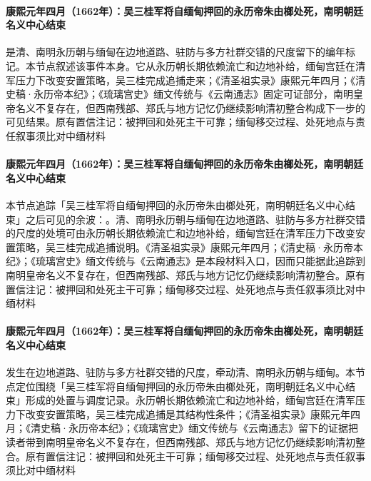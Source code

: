 \paragraph{康熙元年四月（1662年）：吴三桂军将自缅甸押回的永历帝朱由榔处死，南明朝廷名义中心结束}
 是清、南明永历朝与缅甸在边地道路、驻防与多方社群交错的尺度留下的编年标记。本节点叙述该事件本身。它从永历朝长期依赖流亡和边地补给，缅甸宫廷在清军压力下改变安置策略，吴三桂完成追捕走来；《清圣祖实录》康熙元年四月；《清史稿·永历帝本纪》；《琉璃宫史》缅文传统与《云南通志》固定可证部分，南明皇帝名义不复存在，但西南残部、郑氏与地方记忆仍继续影响清初整合构成下一步的可见结果。原有置信注记：被押回和处死主干可靠；缅甸移交过程、处死地点与责任叙事须比对中缅材料

\paragraph{康熙元年四月（1662年）：吴三桂军将自缅甸押回的永历帝朱由榔处死，南明朝廷名义中心结束}
本节点追踪「吴三桂军将自缅甸押回的永历帝朱由榔处死，南明朝廷名义中心结束」之后可见的余波：。清、南明永历朝与缅甸在边地道路、驻防与多方社群交错的尺度的处境可由永历朝长期依赖流亡和边地补给，缅甸宫廷在清军压力下改变安置策略，吴三桂完成追捕说明。《清圣祖实录》康熙元年四月；《清史稿·永历帝本纪》；《琉璃宫史》缅文传统与《云南通志》是本段材料入口，因而只能据此追踪到南明皇帝名义不复存在，但西南残部、郑氏与地方记忆仍继续影响清初整合。原有置信注记：被押回和处死主干可靠；缅甸移交过程、处死地点与责任叙事须比对中缅材料

\paragraph{康熙元年四月（1662年）：吴三桂军将自缅甸押回的永历帝朱由榔处死，南明朝廷名义中心结束}
 发生在边地道路、驻防与多方社群交错的尺度，牵动清、南明永历朝与缅甸。本节点定位围绕「吴三桂军将自缅甸押回的永历帝朱由榔处死，南明朝廷名义中心结束」形成的处置与调度记录。永历朝长期依赖流亡和边地补给，缅甸宫廷在清军压力下改变安置策略，吴三桂完成追捕是其结构性条件；《清圣祖实录》康熙元年四月；《清史稿·永历帝本纪》；《琉璃宫史》缅文传统与《云南通志》留下的证据把读者带到南明皇帝名义不复存在，但西南残部、郑氏与地方记忆仍继续影响清初整合。原有置信注记：被押回和处死主干可靠；缅甸移交过程、处死地点与责任叙事须比对中缅材料

